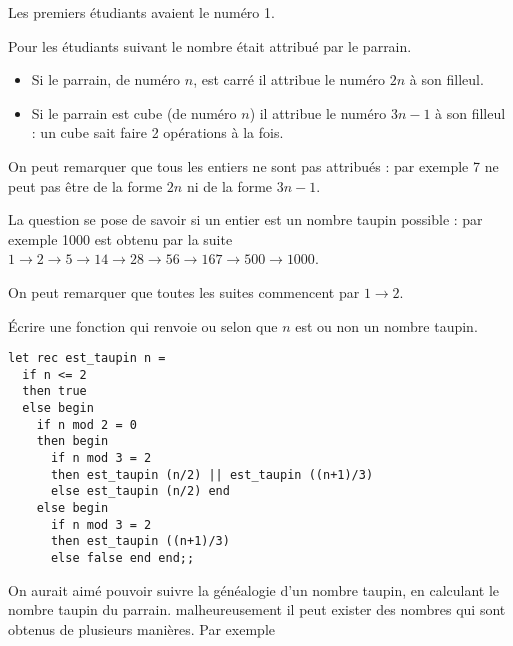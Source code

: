Les premiers étudiants avaient le numéro 1.

Pour les étudiants suivant le nombre était attribué par le parrain.
\begin{itemize}
    \item Si le parrain, de numéro $n$, est carré il attribue le numéro $2n$ à son filleul.
    \item Si le parrain est cube (de numéro $n$) il attribue le numéro $3n - 1$ à son filleul : un cube sait faire 2 opérations à la fois.
\end{itemize}

On peut remarquer que tous les entiers ne sont pas attribués : par exemple 7 ne peut pas être de la forme $2n$ ni de la forme $3n - 1$.

La question se pose de savoir si un entier est un nombre taupin possible : par exemple 1000 est obtenu par la suite
$1 \rightarrow 2 \rightarrow 5 \rightarrow 14 \rightarrow 28 \rightarrow 56 \rightarrow 167  \rightarrow 500  \rightarrow 1000$.


On peut remarquer que toutes les suites commencent par $1\rightarrow 2$.

\begin{Exercise}[title=Test de taupinalité]
Écrire une fonction  qui renvoie  ou  selon que $n$ est ou non un nombre taupin.
\end{Exercise}
\begin{Answer}
\begin{lstlisting}
let rec est_taupin n =
  if n <= 2
  then true
  else begin
    if n mod 2 = 0
    then begin
      if n mod 3 = 2 
      then est_taupin (n/2) || est_taupin ((n+1)/3)
      else est_taupin (n/2) end
    else begin
      if n mod 3 = 2
      then est_taupin ((n+1)/3)
      else false end end;;           
\end{lstlisting}
\newpage
\end{Answer}
\medskip
On aurait aimé pouvoir suivre la généalogie d'un nombre taupin, en calculant le nombre taupin du parrain. malheureusement il peut exister des nombres qui sont obtenus de plusieurs manières. Par exemple

